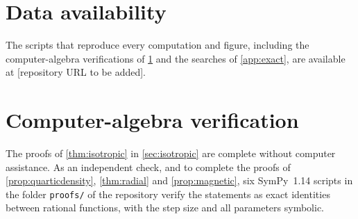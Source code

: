 \documentclass[11pt,a4paper]{article}
\theoremstyle{definition}
\theoremstyle{remark}
\begin{document}
\section*{Data availability}
The scripts that reproduce every computation and figure, including the computer-algebra verifications of
\cref{app:proof} and the searches of \cref{app:exact}, are available at [repository URL to be added].

\appendix
\section{Computer-algebra verification}
\label{app:proof}

The proofs of \cref{thm:isotropic} in \cref{sec:isotropic} are complete without computer assistance. As an
independent check, and to complete the proofs of \cref{prop:quarticdensity}, \cref{thm:radial} and
\cref{prop:magnetic}, six SymPy~1.14 scripts in the folder \texttt{proofs/} of the repository verify the
statements as exact identities between rational functions, with the step size and all parameters symbolic.
\end{document}
